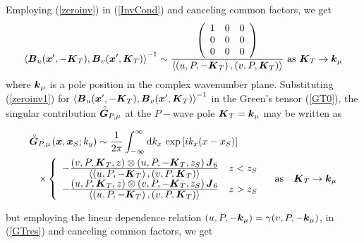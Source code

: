 Employing (\ref{zeroinv}) in (\ref{InvCond}) and canceling common factors,
we get
\begin{equation} \label{zeroinv1}
\left\langle{\mbox{\boldmath$\mit B$\unboldmath}}_{u}({\mbox{\boldmath$\mit x$\unboldmath}}^{\prime},-{\mbox{\boldmath$\mit K$\unboldmath}}_{T}),{\mbox{\boldmath$\mit B$\unboldmath}}_{v}({\mbox{\boldmath$\mit x$\unboldmath}}^{\prime},{\mbox{\boldmath$\mit K$\unboldmath}}_{T})\right\rangle^{-1}\sim 
\frac{
\left({\begin{array}{ccc}1&0&0\\0&0&0\\0&0&0\end{array}}\right)
}{\left\langle{\left({u,P,-{\mbox{\boldmath$\mit K$\unboldmath}}_{T}}\right),
\left({v,P,{\mbox{\boldmath$\mit K$\unboldmath}}_{T}}\right)}\right\rangle}
\ \mbox{as} \ {\mbox{\boldmath$\mit K$\unboldmath}}_{T}\rightarrow {\mbox{\boldmath$\mit k$\unboldmath}}_{\mu}
\end{equation}
where ${\mbox{\boldmath$\mit k$\unboldmath}}_{\mu}$ is a pole position in the complex wavenumber plane. 
Substituting (\ref{zeroinv1}) for  $\left\langle{\mbox{\boldmath$\mit B$\unboldmath}}_{u}({\mbox{\boldmath$\mit x$\unboldmath}}^{\prime},-{\mbox{\boldmath$\mit K$\unboldmath}}_{T}),{\mbox{\boldmath$\mit B$\unboldmath}}_{v}({\mbox{\boldmath$\mit x$\unboldmath}}^{\prime},{\mbox{\boldmath$\mit K$\unboldmath}}_{T})\right\rangle^{-1}$ in the Green's tensor 
(\ref{GT0}), the singular contribution $\stackrel{\scriptscriptstyle _{\,\,\circ}}{ \mbox{\boldmath$\mit G$\unboldmath}}_{P,\mu}$ at the $P-$wave pole
${\mbox{\boldmath$\mit K$\unboldmath}}_{T}= {\mbox{\boldmath$\mit k$\unboldmath}}_{\mu}$ may be written as
\begin{samepage}
\begin{eqnarray}\label{GTres}
\lefteqn{\rf{\bmi G}_{P,\mu}\!({\bmi x},{\bmi x}_{S};k_{y}) \sim 
\frac{1}{2 \pi}\int_{-\infty}^{\infty} {\rm d}k_x\, 
\exp\left[{i{k}_{x }({x-{x}_{S}})}\right]}\\
&&
\times\left\{
{\begin{array}{ll}
-\frac{\textstyle \left({ v,P,{\bmi K}_{T},z}\right) \otimes
\left({ u,P,-{\bmi K}_{T},z_S}\right) {\bmi  J}_{6}}
{\textstyle \left\langle{\left({u,P,-{\bmi K}_{T}}\right),
\left({v,P,{\bmi K}_{T}}\right)}\right\rangle}& 
z<z_{S} \\
-\frac{\textstyle \left({ u,P,{\bmi K}_{T},z}\right) \otimes
\left({ v,P,-{\bmi K}_{T},z_S}\right) {\bmi  J}_{6}}
{\textstyle \left\langle{\left({u,P,-{\bmi K}_{T}}\right),
\left({v,P,{\bmi K}_{T}}\right)}\right\rangle}& z>z_{S} 
\end{array} }\right. \quad \mbox{as} \quad {\bmi K}_{T}\rightarrow {\bmi k}_{\mu}
\nonumber
\end{eqnarray} 
\end{samepage}
but employing the linear dependence relation $(u,P,-{\mbox{\boldmath$\mit k$\unboldmath}}_{\mu})=
\gamma (v,P,-{\mbox{\boldmath$\mit k$\unboldmath}}_{\mu})$, in  (\ref{GTres})  and canceling common 
factors, we get

